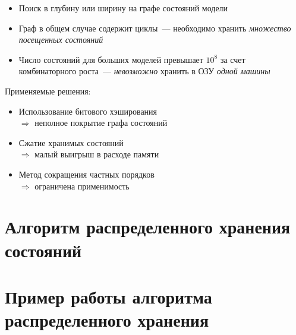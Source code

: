 \documentclass[12pt]{article}
\begin{document}
\small{
  \begin{itemize}
  \item Поиск в глубину или ширину на графе состояний модели
  \item Граф в общем случае содержит циклы~--- необходимо хранить \textit{множество посещенных состояний}
  \item Число состояний для больших моделей превышает $10^{8}$ за счет комбинаторного
    роста~--- \textit{невозможно} хранить в ОЗУ \textit{одной машины}
  \end{itemize}
  
  \begin{minipage}[t]{0.25\linewidth}
    \begin{flushright}
      Применяемые решения:
    \end{flushright}
  \end{minipage}
  \begin{minipage}[t]{0.7\linewidth}
    \begin{flushleft}
      \begin{itemize}
      \item Использование битового \mbox{хэширования} \\ $\Rightarrow$ неполное покрытие графа состояний
      \item Сжатие хранимых состояний \\ $\Rightarrow$ малый выигрыш в расходе памяти
      \item Метод сокращения частных порядков \\ $\Rightarrow$ ограничена применимость
      \end{itemize}
    \end{flushleft}
  \end{minipage}
}

\section{Алгоритм распределенного хранения состояний}
\label{sec:distr-storage}



\section{Пример работы алгоритма распределенного хранения}
\label{sec:distr-storage2}
\end{document}
